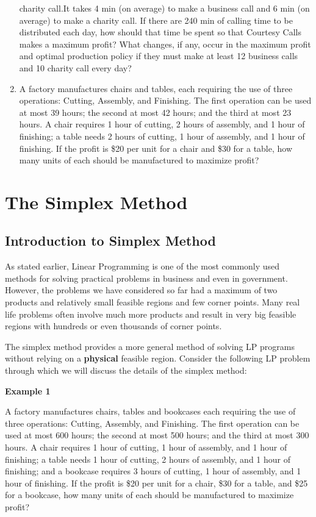 \documentclass[
  letterpaper,
  DIV=11,
  numbers=noendperiod]{scrreprt}
\begin{document}
\begin{enumerate}
  charity call.It takes 4 min (on average) to make a business call and 6
  min (on average) to make a charity call. If there are 240 min of
  calling time to be distributed each day, how should that time be spent
  so that Courtesy Calls makes a maximum profit? What changes, if any,
  occur in the maximum profit and optimal production policy if they must
  make at least 12 business calls and 10 charity call every day?
\item
  A factory manufactures chairs and tables, each requiring the use of
  three operations: Cutting, Assembly, and Finishing. The first
  operation can be used at most 39 hours; the second at most 42 hours;
  and the third at most 23 hours. A chair requires 1 hour of cutting, 2
  hours of assembly, and 1 hour of finishing; a table needs 2 hours of
  cutting, 1 hour of assembly, and 1 hour of finishing. If the profit is
  \$20 per unit for a chair and \$30 for a table, how many units of each
  should be manufactured to maximize profit?
\end{enumerate}

\hypertarget{the-simplex-method}{%
\chapter{The Simplex Method}\label{the-simplex-method}}

\hypertarget{introduction-to-simplex-method}{%
\section{Introduction to Simplex
Method}\label{introduction-to-simplex-method}}

As stated earlier, Linear Programming is one of the most commonly used
methods for solving practical problems in business and even in
government. However, the problems we have considered so far had a
maximum of two products and relatively small feasible regions and few
corner points. Many real life problems often involve much more products
and result in very big feasible regions with hundreds or even thousands
of corner points.

The simplex method provides a more general method of solving LP programs
without relying on a \textbf{physical} feasible region. Consider the
following LP problem through which we will discuss the details of the
simplex method:

\textbf{Example 1}

A factory manufactures chairs, tables and bookcases each requiring the
use of three operations: Cutting, Assembly, and Finishing. The first
operation can be used at most 600 hours; the second at most 500 hours;
and the third at most 300 hours. A chair requires 1 hour of cutting, 1
hour of assembly, and 1 hour of finishing; a table needs 1 hour of
cutting, 2 hours of assembly, and 1 hour of finishing; and a bookcase
requires 3 hours of cutting, 1 hour of assembly, and 1 hour of
finishing. If the profit is \$20 per unit for a chair, \$30 for a table,
and \$25 for a bookcase, how many units of each should be manufactured
to maximize profit?
\end{document}
